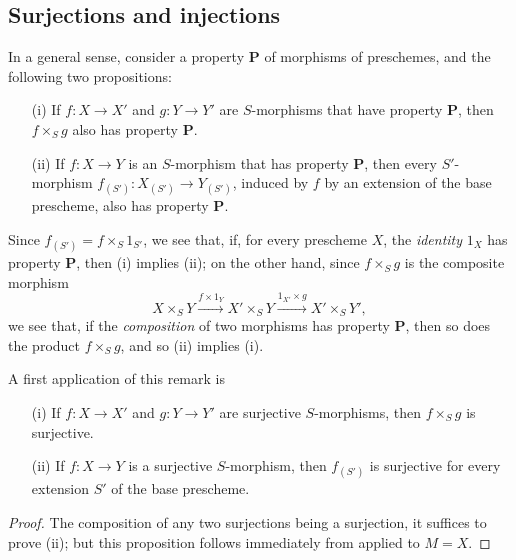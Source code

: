 \subsection{Surjections and injections}
\label{subsection:I.3.5}

\begin{env}[3.5.1]
\label{I.3.5.1}
In a general sense, consider a property $\textbf{P}$ of morphisms of preschemes, and the following two propositions:
\begin{enumerate}
  \item[(i)] If $f:X\to X'$ and $g:Y\to Y'$ are $S$-morphisms that have property $\textbf{P}$, then $f\times_S g$ also has property $\textbf{P}$.
  \item[(ii)] If $f:X\to Y$ is an $S$-morphism that has property $\textbf{P}$, then every $S'$-morphism $f_{(S')}:X_{(S')}\to Y_{(S')}$, induced by $f$ by an extension of the base prescheme, also has property $\textbf{P}$.
\end{enumerate}

Since $f_{(S')}=f\times_S 1_{S'}$, we see that, if, for every prescheme $X$, the \emph{identity} $1_X$ has property $\textbf{P}$, then (i) implies (ii); on the other hand, since $f\times_S g$ is the composite morphism
\[
  X\times_S Y\xrightarrow{f\times1_Y}X'\times_S Y\xrightarrow{1_{X'}\times g}X'\times_S Y',
\]
we see that, if the \emph{composition} of two morphisms has property $\textbf{P}$, then so does the product $f\times_S g$, and so (ii) implies (i).
\end{env}

A first application of this remark is
\begin{proposition}[3.5.2]
\label{I.3.5.2}
\medskip\noindent
\begin{enumerate}
  \item[{\rm(i)}] If $f:X\to X'$ and $g:Y\to Y'$ are surjective $S$-morphisms, then $f\times_S g$ is surjective.
  \item[{\rm(ii)}] If $f:X\to Y$ is a surjective $S$-morphism, then $f_{(S')}$ is surjective for every extension $S'$ of the base prescheme.
\end{enumerate}
\end{proposition}

\begin{proof}
The composition of any two surjections being a surjection, it suffices to prove (ii); but this proposition follows immediately from  applied to $M=X$.
\end{proof}

